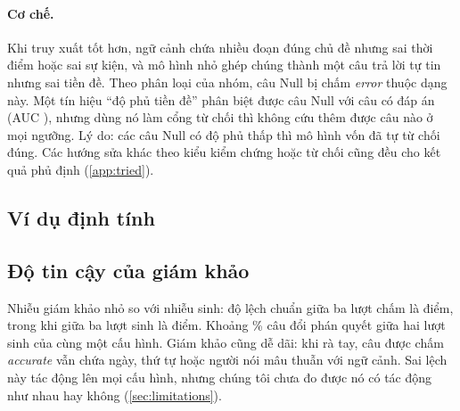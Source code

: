 \begin{table}[t]\centering
\caption{Nhóm Null (45 câu ngoài dev) dưới hai rubric giám khảo, trung bình 3 lượt chấm và các lượt sinh. Rubric làm rõ là phân tích độ nhạy, hiệu chuẩn trên nhãn của một người; số chính thức là cột rubric gốc. Rubric làm rõ gần như không dùng nhãn \emph{neither}, nên chỉ so acc và err giữa hai cột.}
\label{tab:null}
\small

\end{table}

\paragraph{Cơ chế.}
Khi truy xuất tốt hơn, ngữ cảnh chứa nhiều đoạn đúng chủ đề nhưng sai thời điểm hoặc sai sự kiện, và mô hình nhỏ ghép chúng thành một câu trả lời tự tin nhưng sai tiền đề.
Theo phân loại của nhóm, \nullPremise{} câu Null bị chấm \emph{error} thuộc dạng này.
Một tín hiệu ``độ phủ tiền đề'' phân biệt được câu Null với câu có đáp án (AUC \premiseAUC), nhưng dùng nó làm cổng từ chối thì không cứu thêm được câu nào ở mọi ngưỡng.
Lý do: các câu Null có độ phủ thấp thì mô hình vốn đã tự từ chối đúng.
Các hướng sửa khác theo kiểu kiểm chứng hoặc từ chối cũng đều cho kết quả phủ định (\cref{app:tried}).

\subsection{Ví dụ định tính}

\subsection{Độ tin cậy của giám khảo}
Nhiễu giám khảo nhỏ so với nhiễu sinh: độ lệch chuẩn giữa ba lượt chấm là \sdJudgeBase{} điểm, trong khi giữa ba lượt sinh là \sdGenGV{} điểm.
Khoảng \flipRate\% câu đổi phán quyết giữa hai lượt sinh của cùng một cấu hình.
Giám khảo cũng dễ dãi: khi rà tay, \judgeLenient{} câu được chấm \emph{accurate} vẫn chứa ngày, thứ tự hoặc người nói mâu thuẫn với ngữ cảnh.
Sai lệch này tác động lên mọi cấu hình, nhưng chúng tôi chưa đo được nó có tác động như nhau hay không (\cref{sec:limitations}).

